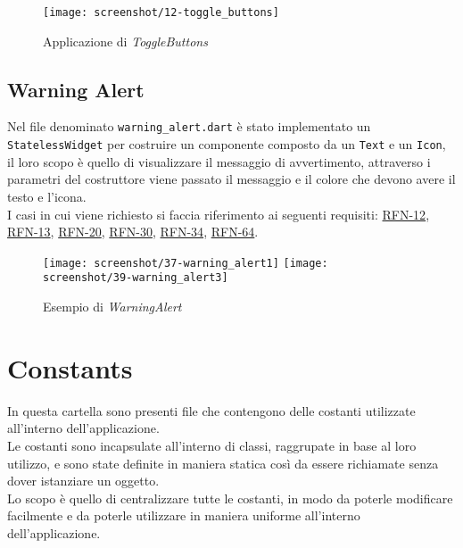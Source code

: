 \begin{figure}[!h] 
    \centering 
    \texttt{[image: screenshot/12-toggle\_buttons]} 
    \caption{Applicazione di \emph{ToggleButtons}}
    \label{fig:toggle-button}
\end{figure}

\clearpage

\subsection{Warning Alert}
\label{subsec:warning-alert}

Nel file denominato \lstinline{warning_alert.dart} è stato implementato un \lstinline{StatelessWidget} per costruire un componente composto da un \lstinline{Text}\cite{site:text} e un \lstinline{Icon}\cite{site:icon}, il loro scopo è quello di visualizzare il messaggio di avvertimento, attraverso i parametri del costruttore viene passato il messaggio e il colore che devono avere il testo e l'icona.\\
I casi in cui viene richiesto si faccia riferimento ai seguenti requisiti: \hyperref[RFN-12]{RFN-12}, \hyperref[RFN-13]{RFN-13}, \hyperref[RFN-20]{RFN-20}, \hyperref[RFN-30]{RFN-30}, \hyperref[RFN-34]{RFN-34}, \hyperref[RFN-64]{RFN-64}.

\begin{figure}[!h] 
    \centering 
    \texttt{[image: screenshot/37-warning\_alert1]}
    \hfill
    \texttt{[image: screenshot/39-warning\_alert3]} 
    \caption{Esempio di \emph{WarningAlert}}
    \label{fig:warning-alert}
\end{figure}

\section{Constants}
\label{sec:constants}

In questa cartella sono presenti file che contengono delle costanti utilizzate all'interno dell'applicazione.\\
Le costanti sono incapsulate all'interno di classi, raggrupate in base al loro utilizzo, e sono state definite in maniera statica così da essere richiamate senza dover istanziare un oggetto.\\
Lo scopo è quello di centralizzare tutte le costanti, in modo da poterle modificare facilmente e da poterle utilizzare in maniera uniforme all'interno dell'applicazione.

